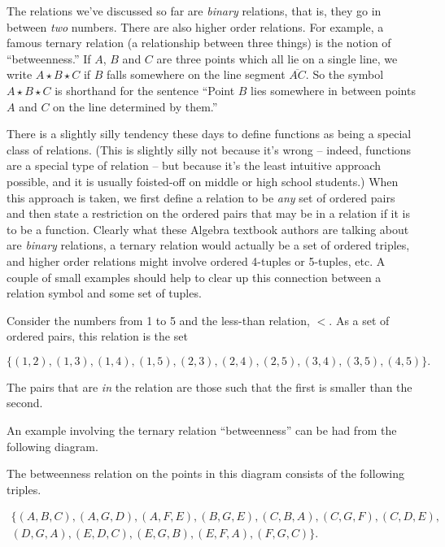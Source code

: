 The relations we've discussed so far are  
\emph{binary} relations, that
is, they go in between \emph{two} numbers.  There are also higher order
relations.  For example, a famous  ternary 
relation (a relationship between
three things) is the notion of ``betweenness.''  If $A$, $B$ and $C$ are
three points which all lie on a single line, we write $A\star B \star C$
if $B$ falls somewhere on the line segment $\overline{AC}$.  So the
symbol $A\star B \star C$ is shorthand for the sentence ``Point $B$ lies
somewhere in between points $A$ and $C$ on the line determined by them.''

There is a slightly silly tendency these days to define functions as being
a special class of relations.  (This is slightly silly not because it's wrong
-- indeed, functions are a special type of relation -- but because it's the 
least intuitive approach possible, and it is usually foisted-off on middle or
high school students.)  When this approach is taken, we first define
a relation to be \emph{any} set of ordered pairs and then state a 
restriction on the ordered pairs that may be in a relation if it 
is to be a function.  Clearly what these Algebra textbook authors 
are talking about are \emph{binary} relations, a ternary relation 
would actually be a set of ordered triples, and higher order relations
might involve ordered 4-tuples or 5-tuples, etc.  A couple of small examples 
should help to clear up this connection between a relation symbol and 
some set of tuples.

Consider the numbers from 1 to 5 and the less-than relation, $<$.  
As a set of ordered pairs, this relation is the set 

\[ \{(1,2), (1,3), (1,4), (1,5), (2,3), (2,4), (2,5), (3,4), (3,5), (4,5) \}. \]

The pairs that are \emph{in} the relation are those such that the first is smaller than the second.

An example involving the ternary relation ``betweenness'' can be had 
from the following diagram.
\medskip


\medskip

The betweenness relation on the points in this diagram consists of the 
following triples.

\begin{gather*} \{ (A,B,C), (A,G,D), (A,F,E), (B,G,E), (C,B,A), (C,G,F), (C,D,E), \\
(D,G,A), (E,D,C), (E,G,B), (E,F,A), (F,G,C) \}. 
\end{gather*}

